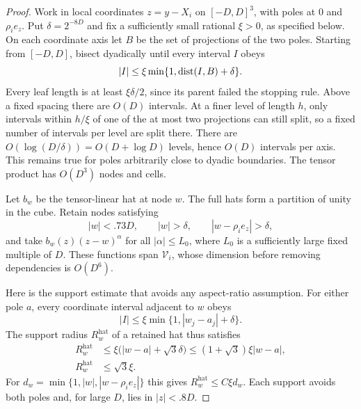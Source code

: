 \begin{proof}
Work in local coordinates \(z=y-X_i\) on \([-D,D]^3\), with poles
at \(0\) and \(\rho_i e_z\). Put \(\delta=2^{-8D}\) and fix a sufficiently
small rational \(\xi>0\), as specified below. On each coordinate axis
let \(B\) be the set of projections of the two poles. Starting from
\([-D,D]\), bisect dyadically until every interval \(I\) obeys
\begin{equation}
 |I|\le\xi\min\{1,\operatorname{dist}(I,B)+\delta\}.
 \label{eq:wells-grid-rule}
\end{equation}
Every leaf length is at least \(\xi\delta/2\), since its parent failed
the stopping rule. Above a fixed spacing there are \(O(D)\) intervals.
At a finer level of length \(h\), only intervals within \(h/\xi\) of
one of the at most two projections can still split, so a fixed number
of intervals per level are split there.
There are \(O(\log(D/\delta))=O(D+\log D)\) levels, hence \(O(D)\)
intervals per axis. This remains true for poles arbitrarily close to
dyadic boundaries. The tensor product has \(O(D^3)\) nodes and cells.

Let \(b_w\) be the tensor-linear hat at node \(w\). The full hats form
a partition of unity in the cube. Retain nodes satisfying
\begin{equation}
 |w|<.73D,\qquad |w|>\delta,\qquad
 |w-\rho_i e_z|>\delta,
 \label{eq:wells-retained-nodes}
\end{equation}
and take \(b_w(z)(z-w)^\alpha\) for all \(|\alpha|\le L_0\), where \(L_0\)
is a sufficiently large fixed multiple of \(D\). These functions span
\(\mathcal V_i\), whose dimension before removing dependencies is
\(O(D^6)\).

Here is the support estimate that avoids any aspect-ratio assumption.
For either pole \(a\), every coordinate interval adjacent to \(w\) obeys
\[
 |I|\le\xi\min\{1,|w_j-a_j|+\delta\}.
\]
The support radius \(R_w^{\mathrm{hat}}\) of a retained hat thus satisfies
\begin{equation}
\begin{split}
 R_w^{\mathrm{hat}}
 &\le\xi\bigl(|w-a|+\sqrt3\delta\bigr)
   \le(1+\sqrt3)\xi|w-a|,\\
 R_w^{\mathrm{hat}}&\le\sqrt3\xi.
\end{split}
 \label{eq:wells-patch-radius}
\end{equation}
For \(d_w=\min\{1,|w|,|w-\rho_i e_z|\}\) this gives
\(R_w^{\mathrm{hat}}\le C\xi d_w\). Each support avoids both poles and,
for large \(D\), lies in \(|z|<.8D\).


\end{proof}
